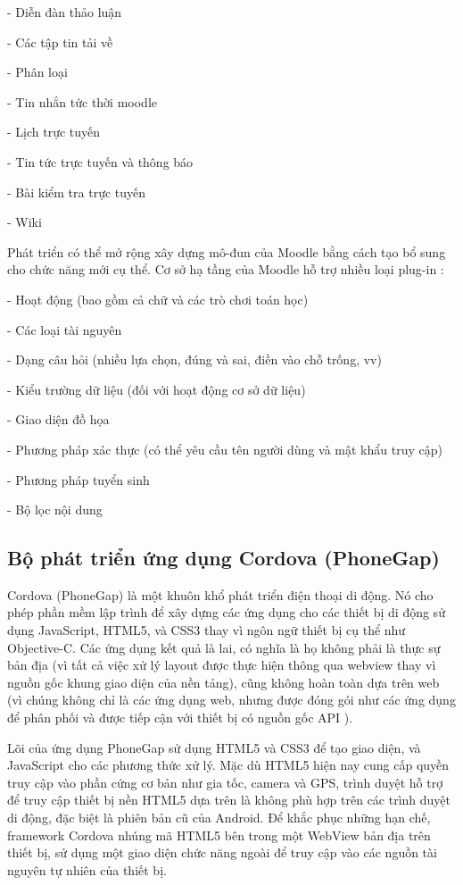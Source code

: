 \quad - Diễn đàn thảo luận

\quad - Các tập tin tải về

\quad - Phân loại

\quad - Tin nhắn tức thời moodle

\quad - Lịch trực tuyến

\quad - Tin tức trực tuyến và thông báo

\quad - Bài kiểm tra trực tuyến

\quad - Wiki

Phát triển có thể mở rộng xây dựng mô-đun của Moodle bằng cách tạo bổ sung cho chức năng mới cụ thể. Cơ sở hạ tầng của Moodle hỗ trợ nhiều loại plug-in :

\quad - Hoạt động (bao gồm cả chữ và các trò chơi toán học)

\quad - Các loại tài nguyên

\quad - Dạng câu hỏi (nhiều lựa chọn, đúng và sai, điền vào chỗ trống, vv)

\quad - Kiểu trường dữ liệu (đối với hoạt động cơ sở dữ liệu)

\quad - Giao diện đồ họa

\quad - Phương pháp xác thực (có thể yêu cầu tên người dùng và mật khẩu truy cập)

\quad - Phương pháp tuyển sinh

\quad - Bộ lọc nội dung

\subsection{Bộ phát triển ứng dụng Cordova (PhoneGap)}

Cordova (PhoneGap) là một khuôn khổ phát triển điện thoại di động. Nó cho phép phần mềm lập trình để xây dựng các ứng dụng cho các thiết bị di động sử dụng JavaScript, HTML5, và CSS3 thay vì ngôn ngữ thiết bị cụ thể như Objective-C. Các ứng dụng kết quả là lai, có nghĩa là họ không phải là thực sự bản địa (vì tất cả việc xử lý layout được thực hiện thông qua webview thay vì nguồn gốc khung giao diện của nền tảng), cũng không hoàn toàn dựa trên web (vì chúng không chỉ là các ứng dụng web, nhưng được đóng gói như các ứng dụng để phân phối và được tiếp cận với thiết bị có nguồn gốc API ).

Lõi của ứng dụng PhoneGap sử dụng HTML5 và CSS3 để tạo giao diện, và JavaScript cho các phương thức xử lý. Mặc dù HTML5 hiện nay cung cấp quyền truy cập vào phần cứng cơ bản như gia tốc, camera và GPS, trình duyệt hỗ trợ để truy cập thiết bị nền HTML5 dựa trên là không phù hợp trên các trình duyệt di động, đặc biệt là phiên bản cũ của Android. Để khắc phục những hạn chế, framework Cordova nhúng mã HTML5 bên trong một WebView bản địa trên thiết bị, sử dụng một giao diện chức năng ngoài để truy cập vào các nguồn tài nguyên tự nhiên của thiết bị.

